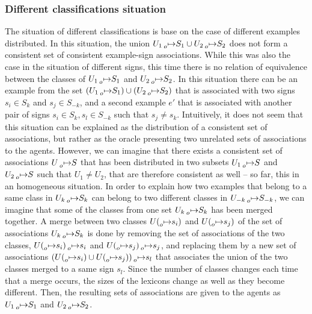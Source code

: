 \subsubsection{Different classifications situation} The situation of different classifications is base on the case of different examples distributed. In this situation, the union $U_{1} \prescript{}{o}{\mapsto} S_{1} \cup U_{2} \prescript{}{o}{\mapsto} S_{2}$ does not form a consistent set of consistent example-sign associations. While this was also the case in the situation of different signs, this time there is no relation of equivalence between the classes of $U_{1} \prescript{}{o}{\mapsto} S_{1}$ and $U_{2} \prescript{}{o}{\mapsto} S_{2}$. In this situation there can be an example from the set $(U_{1} \prescript{}{o}{\mapsto} S_{1}) \cup (U_{2} \prescript{}{o}{\mapsto} S_{2})$ that is associated with two signs $s_{i} \in S_{k}$ and $s_{j} \in S_{-k}$, and a second example $e'$ that is associated with another pair of signs $s_{i} \in S_{k}, s_{l} \in S_{-k}$ such that $s_{j} \neq s_{k}$. Intuitively, it does not seem that this situation can be explained as the distribution of a consistent set of associations, but rather as the oracle presenting two unrelated sets of associations to the agents. However, we can imagine that there exists a consistent set of associations $U \prescript{}{o}{\mapsto} S$ that has been distributed in two subsets $U_{1} \prescript{}{o}{\mapsto} S$ and $U_{2} \prescript{}{o}{\mapsto} S$ such that $U_{1} \neq U_{2}$, that are therefore consistent as well -- so far, this in an homogeneous situation. In order to explain how two examples that belong to a same class in $U_{k} \prescript{}{o}{\mapsto} S_{k}$ can belong to two different classes in  $U_{-k} \prescript{}{o}{\mapsto} S_{-k}$, we can imagine that some of the classes from one set $U_{k} \prescript{}{o}{\mapsto} S_{k}$ has been merged together. A merge between two classes $U(\prescript{}{o}{\mapsto} s_{i})$ and $U(\prescript{}{o}{\mapsto} s_{j})$ of the set of associations $U_{k} \prescript{}{o}{\mapsto} S_{k}$ is done by removing the set of associations of the two classes, $U(\prescript{}{o}{\mapsto} s_{i}) \prescript{}{o}{\mapsto} s_{i}$ and $U(\prescript{}{o}{\mapsto} s_{j}) \prescript{}{o}{\mapsto} s_{j}$, and replacing them by a new set of associations $(U(\prescript{}{o}{\mapsto} s_{i}) \cup U(\prescript{}{o}{\mapsto} s_{j})) \prescript{}{o}{\mapsto} s_{l}$ that associates the union of the two classes merged to a same sign $s_{l}$. Since the number of classes changes each time that a merge occurs, the sizes of the lexicons change as well as they become different. Then, the resulting sets of associations are given to the agents as $U_{1} \prescript{}{o}{\mapsto} S_{1}$ and $U_{2} \prescript{}{o}{\mapsto} S_{2}$.

